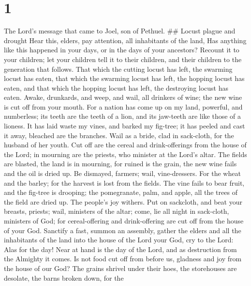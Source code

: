 \hypertarget{section}{%
\section{1}\label{section}}

 The Lord's message that came to Joel, son of Pethuel. \#\#
Locust plague and drought  Hear this, elders, pay attention,
all inhabitants of the land, Has anything like this happened in your
days, or in the days of your ancestors?  Recount it to your
children; let your children tell it to their children, and their
children to the generation that follows.  That which the
cutting locust has left, the swarming locust has eaten, that which the
swarming locust has left, the hopping locust has eaten, and that which
the hopping locust has left, the destroying locust has eaten.
 Awake, drunkards, and weep, and wail, all drinkers of wine;
the new wine is cut off from your mouth.  For a nation has
come up on my land, powerful, and numberless; its teeth are the teeth of
a lion, and its jaw-teeth are like those of a lioness.  It
has laid waste my vines, and barked my fig-tree; it has peeled and cast
it away, bleached are the branches.  Wail as a bride, clad
in sack-cloth, for the husband of her youth.  Cut off are
the cereal and drink-offerings from the house of the Lord; in mourning
are the priests, who minister at the Lord's altar.  The
fields are blasted, the land is in mourning, for ruined is the grain,
the new wine fails and the oil is dried up.  Be dismayed,
farmers; wail, vine-dressers. For the wheat and the barley; for the
harvest is lost from the fields.  The vine fails to bear
fruit, and the fig-tree is drooping; the pomegranate, palm, and apple,
all the trees of the field are dried up. The people's joy withers.
 Put on sackcloth, and beat your breasts, priests; wail,
ministers of the altar; come, lie all night in sack-cloth, ministers of
God; for cereal-offering and drink-offering are cut off from the house
of your God.  Sanctify a fast, summon an assembly, gather
the elders and all the inhabitants of the land into the house of the
Lord your God, cry to the Lord:  Alas for the day! Near at
hand is the day of the Lord, and as destruction from the Almighty it
comes.  Is not food cut off from before us, gladness and
joy from the house of our God?  The grains shrivel under
their hoes, the storehouses are desolate, the barns broken down, for the
